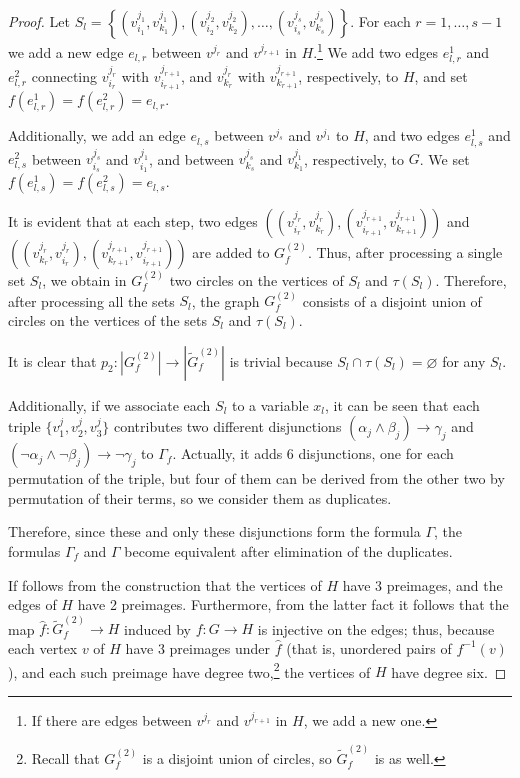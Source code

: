 \documentclass[a4paper,12pt,reqno,oneside]{amsart}
\theoremstyle{plain}
\theoremstyle{definition}
\theoremstyle{plain}
\newcommand{\from}{\colon}
\newcommand{\wt}[1]{\widetilde{#1}}
\begin{document}
\begin{proof}
  Let
  $S_l = \left\{ (v^{j_1}_{i_1}, v^{j_1}_{k_1}), (v^{j_2}_{i_2}, v^{j_2}_{k_2}), \dots,
    (v^{j_s}_{i_s}, v^{j_s}_{k_s}) \right\}$. For each $r = 1, \dots, s-1$ we add a new edge
  $e_{l,r}$ between $v^{j_r}$ and $v^{j_{r+1}}$ in $H$.\footnote{If there are edges between $v^{j_r}$ and
    $v^{j_{r+1}}$ in $H$, we add a new one.} We add two edges $e_{l,r}^1$ and
  $e_{l,r}^2$ connecting $v^{j_r}_{i_r}$ with $v^{j_{r+1}}_{i_{r+1}}$, and $v^{j_r}_{k_r}$ with
  $v^{j_{r+1}}_{k_{r+1}}$, respectively, to $H$, and set $f(e^1_{l,r}) = f(e^2_{l,r}) =
  e_{l,r}$.

  Additionally, we add an edge $e_{l,s}$ between $v^{j_s}$ and $v^{j_1}$ to $H$, and two
  edges $e^1_{l,s}$ and $e^2_{l,s}$ between $v^{j_s}_{i_s}$ and $v^{j_1}_{i_1}$, and between
  $v^{j_s}_{k_s}$ and $v^{j_1}_{k_1}$, respectively, to $G$. We set
  $f(e^1_{l,s}) = f(e^2_{l,s}) = e_{l,s}$.

  It is evident that at each step, two edges $((v^{j_r}_{i_r}, v^{j_r}_{k_r}), (v^{j_{r+1}}_{i_{r+1}},
  v^{j_{r+1}}_{k_{r+1}}))$ and $((v^{j_r}_{k_r}, v^{j_r}_{i_r}), (v^{j_{r+1}}_{k_{r+1}},
  v^{j_{r+1}}_{i_{r+1}}))$ are added to $G^{(2)}_f$. Thus, after processing a single set $S_l$, we
  obtain in $G^{(2)}_f$ two circles on the vertices of $S_l$ and $\tau(S_l)$. Therefore, after
  processing all the sets $S_l$, the graph $G^{(2)}_f$ consists of a disjoint union of circles on the
  vertices of the sets $S_l$ and $\tau(S_l)$.

  It is clear that $p_2 \from |G^{(2)}_f| \to |\wt{G}^{(2)}_f|$ is trivial because $S_l \cap
  \tau(S_l) = \varnothing$ for any $S_l$.

  Additionally, if we associate each $S_l$ to a variable $x_l$, it can be seen that each triple
  $\{v^j_1, v^j_2, v^j_3\}$ contributes two different disjunctions
  $(\alpha_j \land \beta_j) \to \gamma_j$ and $(\neg \alpha_j \land \neg \beta_j) \to \neg \gamma_j$
  to $\Gamma_f$. Actually, it adds 6 disjunctions, one for each permutation of the triple, but four
  of them can be derived from the other two by permutation of their terms, so we consider them as
  duplicates.

  Therefore, since these and only these disjunctions form the formula $\Gamma$, the formulas
  $\Gamma_f$ and $\Gamma$ become equivalent after elimination of the duplicates.

  If follows from the construction that the vertices of $H$ have 3 preimages, and the edges of $H$
  have 2 preimages. Furthermore, from the latter fact it follows that the map $\hat{f} \from
  \wt{G}^{(2)}_f \to H$ induced by $f \from G \to H$ is injective on the edges; thus, because each
  vertex $v$ of $H$ have 3 preimages under $\hat{f}$ (that is, unordered pairs of $f^{-1}(v)$), and
  each such preimage have degree two,\footnote{Recall that $G^{(2)}_f$ is a disjoint union of
    circles, so $\wt{G}^{(2)}_f$ is as well.} the vertices of $H$ have degree six.


\end{proof}
\end{document}
